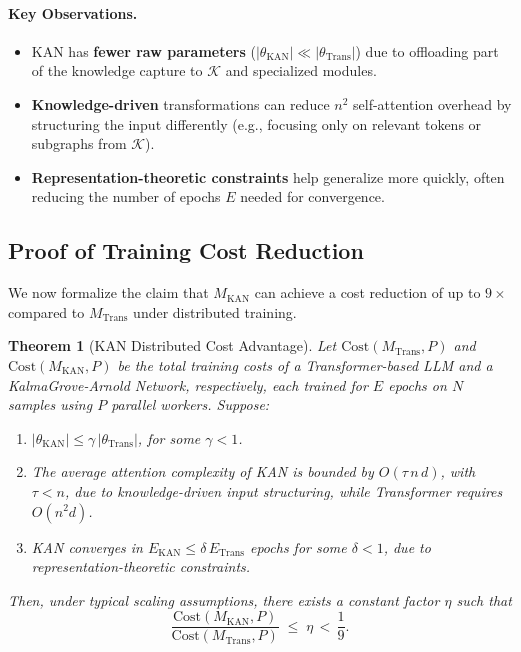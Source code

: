 \documentclass[11pt]{article}
\newtheorem{theorem}{Theorem}
\begin{document}
\paragraph{Key Observations.}
\begin{itemize}
    \item KAN has \textbf{fewer raw parameters} ($|\theta_{\mathrm{KAN}}| \ll |\theta_{\mathrm{Trans}}|$) due to offloading part of the knowledge capture to $\mathcal{K}$ and specialized modules.
    \item \textbf{Knowledge-driven} transformations can reduce $n^2$ self-attention overhead by structuring the input differently (e.g., focusing only on relevant tokens or subgraphs from $\mathcal{K}$).
    \item \textbf{Representation-theoretic constraints} help generalize more quickly, often reducing the number of epochs $E$ needed for convergence.
\end{itemize}

\subsection{Proof of Training Cost Reduction}
We now formalize the claim that $M_{\mathrm{KAN}}$ can achieve a cost reduction of up to $9\times$ compared to $M_{\mathrm{Trans}}$ under distributed training.

\begin{theorem}[KAN Distributed Cost Advantage]
\label{thm:distributed_cost}
Let $\mathrm{Cost}(M_{\mathrm{Trans}}, P)$ and $\mathrm{Cost}(M_{\mathrm{KAN}}, P)$ be the total training costs of a Transformer-based LLM and a KalmaGrove-Arnold Network, respectively, each trained for $E$ epochs on $N$ samples using $P$ parallel workers. Suppose:
\begin{enumerate}
    \item $|\theta_{\mathrm{KAN}}| \leq \gamma\,|\theta_{\mathrm{Trans}}|$, for some $\gamma < 1$.
    \item The average attention complexity of KAN is bounded by $O(\tau\,n \,d)$, with $\tau < n$, due to knowledge-driven input structuring, while Transformer requires $O(n^2 d)$.
    \item KAN converges in $E_{\mathrm{KAN}} \leq \delta\,E_{\mathrm{Trans}}$ epochs for some $\delta < 1$, due to representation-theoretic constraints.
\end{enumerate}
Then, under typical scaling assumptions, there exists a constant factor $\eta$ such that
\begin{equation}
    \label{eq:kan_vs_llm}
    \frac{\mathrm{Cost}(M_{\mathrm{KAN}}, P)}{\mathrm{Cost}(M_{\mathrm{Trans}}, P)} \;\leq\; \eta \,<\, \frac{1}{9}.
\end{equation}
\end{theorem}
\end{document}
